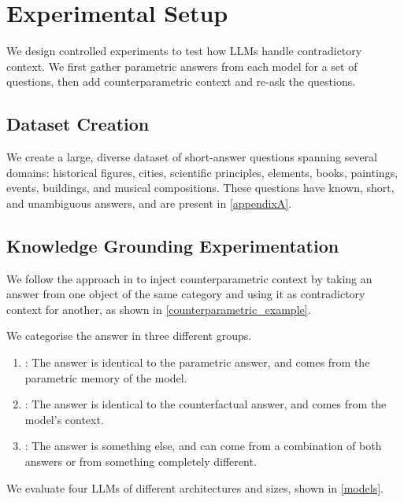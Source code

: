 \section{Experimental Setup}

We design controlled experiments to test how LLMs handle contradictory context.
We first gather parametric answers from each model for a set of questions, then add counterparametric context and re-ask the questions.

\subsection{Dataset Creation}
We create a large, diverse dataset of short-answer questions spanning several domains: historical figures, cities, scientific principles, elements, books, paintings, events, buildings, and musical compositions.
These questions have known, short, and unambiguous answers, and are present in \cref{appendixA}.


\subsection{Knowledge Grounding Experimentation}


We follow the approach in \cite{factual_recall} to inject counterparametric context by taking an answer from one object of the same category and using it as contradictory context for another, as shown in \cref{counterparametric_example}.

We categorise the answer in three different groups. 
\begin{enumerate}
	\item \Parametric{}: The answer is identical to the parametric answer, and comes from the parametric memory of the model.
	\item \Contextual{}: The answer is identical to the counterfactual answer, and comes from the model's context.
	\item \Other{}: The answer is something else, and can come from a combination of both answers or from something completely different.
\end{enumerate}

We evaluate four LLMs of different architectures and sizes, shown in \cref{models}.

